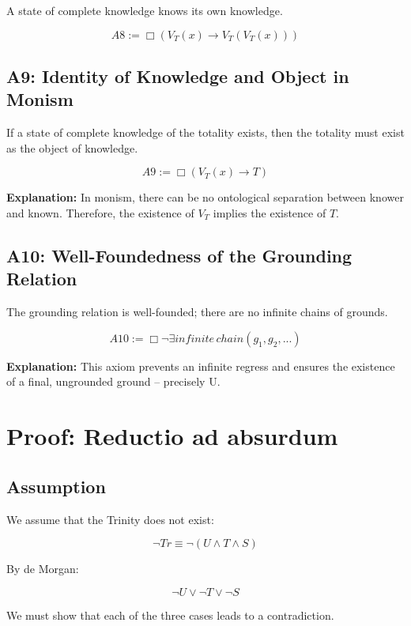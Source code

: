 \documentclass[
]{article}
\begin{document}
A state of complete knowledge knows its own knowledge.

\[
\boxed{A8 := \Box(V_T(x) \rightarrow V_T(V_T(x)))}
\]

\subsection{A9: Identity of Knowledge and Object in Monism}\label{a9-identity-of-knowledge-and-object-in-monism}

If a state of complete knowledge of the totality exists, then the totality must exist as the object of knowledge.

\[
\boxed{A9 := \Box(V_T(x) \rightarrow T)}
\]

\textbf{Explanation:} In monism, there can be no ontological separation between knower and known. Therefore, the existence of \(V_T\) implies the existence of \(T\).

\subsection{A10: Well-Foundedness of the Grounding Relation}\label{a10-well-foundedness-of-the-grounding-relation}

The grounding relation is well-founded; there are no infinite chains of grounds.

\[
\boxed{A10 := \Box\neg\exists infinite\, chain(g_1, g_2, ...)}
\]

\textbf{Explanation:} This axiom prevents an infinite regress and ensures the existence of a final, ungrounded ground -- precisely U.

\section{Proof: Reductio ad absurdum}\label{proof-reductio-ad-absurdum}

\subsection{Assumption}\label{assumption}

We assume that the Trinity does not exist:

\[
\neg Tr \equiv \neg(U \land T \land S)
\]

By de Morgan:

\[
\neg U \lor \neg T \lor \neg S
\]

We must show that each of the three cases leads to a contradiction.
\end{document}
